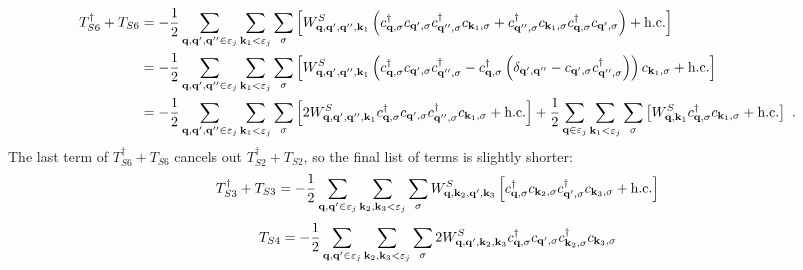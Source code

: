 \documentclass{revtex4-2}
\begin{document}
\begin{equation}\begin{aligned}
	T_{S6}^\dagger + T_{S6} &= - \frac{1}{2}\sum_{{\bf q}, {\bf q}^\prime, {\bf q}^{\prime\prime} \in \varepsilon_j}\sum_{{\bf k}_1 < \varepsilon_j}\sum_{\sigma} \left[W^S_{{\bf q},{\bf q}^\prime,{\bf q}^{\prime\prime}, {\bf k}_1}\left(c^\dagger_{{\bf q},\sigma}c_{{\bf q}^\prime,\sigma}c^\dagger_{{\bf q}^{\prime\prime},\sigma}c_{{\bf k}_1,\sigma} + c^\dagger_{{\bf q}^{\prime\prime},\sigma}c_{{\bf k}_1,\sigma}c^\dagger_{{\bf q},\sigma}c_{{\bf q}^\prime,\sigma}\right) + \text{h.c.}\right]\\
				&= - \frac{1}{2}\sum_{{\bf q}, {\bf q}^\prime, {\bf q}^{\prime\prime} \in \varepsilon_j}\sum_{{\bf k}_1 < \varepsilon_j}\sum_{\sigma} \left[W^S_{{\bf q},{\bf q}^\prime,{\bf q}^{\prime\prime}, {\bf k}_1}\left(c^\dagger_{{\bf q},\sigma}c_{{\bf q}^\prime,\sigma}c^\dagger_{{\bf q}^{\prime\prime},\sigma} - c^\dagger_{{\bf q},\sigma}\left(\delta_{{\bf q}^\prime,{\bf q}^{\prime\prime}} - c_{{\bf q}^\prime,\sigma}c^\dagger_{{\bf q}^{\prime\prime},\sigma}\right)\right) c_{{\bf k}_1,\sigma} + \text{h.c.}\right]\\
				&= - \frac{1}{2}\sum_{{\bf q}, {\bf q}^\prime, {\bf q}^{\prime\prime} \in \varepsilon_j}\sum_{{\bf k}_1 < \varepsilon_j}\sum_{\sigma}\left[2W^S_{{\bf q},{\bf q}^\prime,{\bf q}^{\prime\prime}, {\bf k}_1}c^\dagger_{{\bf q},\sigma}c_{{\bf q}^\prime,\sigma}c^\dagger_{{\bf q}^{\prime\prime},\sigma}c_{{\bf k}_1,\sigma} + \text{h.c.}\right] + \frac{1}{2}\sum_{{\bf q} \in \varepsilon_j}\sum_{{\bf k}_1 < \varepsilon_j}\sum_{\sigma}\left[W^S_{{\bf q}, {\bf k}_1}c^\dagger_{{\bf q},\sigma}c_{{\bf k}_1,\sigma} + \text{h.c.}\right]~.\\
\end{aligned}\end{equation}
The last term of \(T_{S6}^\dagger + T_{S6}\) cancels out \(T_{S2}^\dagger + T_{S2}\), so the final list of terms is slightly shorter:
\begin{equation}\begin{aligned}
	T_{S3}^\dagger + T_{S3} &= - \frac{1}{2}\sum_{{\bf q}, {\bf q}^\prime \in \varepsilon_j}\sum_{{\bf k}_2, {\bf k}_3 < \varepsilon_j}\sum_{\sigma} W^S_{{\bf q},{\bf k}_2, {\bf q}^\prime, {\bf k}_3}\left[c^\dagger_{{\bf q},\sigma}c_{{\bf k}_2,\sigma}c^\dagger_{{\bf q}^\prime,\sigma}c_{{\bf k}_3,\sigma} + \text{h.c.}\right]\\
\end{aligned}\end{equation}
\begin{equation}\begin{aligned}
	T_{S4} &= - \frac{1}{2}\sum_{{\bf q}, {\bf q}^\prime \in \varepsilon_j}\sum_{{\bf k}_2, {\bf k}_3 < \varepsilon_j}\sum_{\sigma}2W^S_{{\bf q},{\bf q}^\prime,{\bf k}_2,{\bf k}_3} c^\dagger_{{\bf q},\sigma}c_{{\bf q}^\prime,\sigma}c^\dagger_{{\bf k}_2,\sigma}c_{{\bf k}_3,\sigma}\\
\end{aligned}\end{equation}
\end{document}
